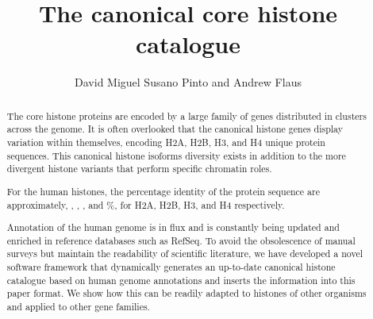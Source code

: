 \documentclass[10pt,a4paper,onecolumn,article]{memoir}
\author{David Miguel Susano Pinto and Andrew Flaus}
\title{The canonical core histone catalogue}
\begin{document}

  \maketitle

  \begin{abstract}
    The core histone proteins are encoded by a large family of genes distributed in clusters across the
    genome. It is often overlooked that the canonical histone genes display variation within
    themselves, encoding \HTwoAUniqueProteins{} H2A, \HTwoBUniqueProteins{} H2B,
    \HThreeUniqueProteins{} H3, and \HFourUniqueProteins{} H4
    unique protein sequences. This canonical histone isoforms diversity exists
    in addition to the more divergent histone variants that perform specific chromatin roles.

    For the human histones, the percentage identity of the protein sequence are
    approximately, \HTwoAPID{}, \HTwoBPID{}, \HThreePID{}, and \HFourPID{}\%, for
    H2A, H2B, H3, and H4 respectively.

    Annotation of the human genome is in flux and is constantly being updated and enriched in reference
    databases such as RefSeq. To avoid the obsolescence of manual surveys but maintain the readability
    of scientific literature, we have developed a novel software framework that dynamically generates
    an up-to-date canonical histone catalogue based on human genome annotations and inserts the
    information into this paper format. We show how this can be readily adapted to histones of other
    organisms and applied to other gene families.
  \end{abstract}

  
  
  
  
\end{document}
